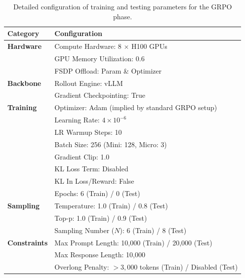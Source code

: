 \begin{table}[htbp]
\centering
\caption{Detailed configuration of training and testing parameters for the GRPO phase.}
\label{tab:grpo_config_styled}
\renewcommand{\arraystretch}{1.15} 

\begin{tabular}{ll}
\toprule
\textbf{Category} & Configuration \\ 
\midrule
\textbf{Hardware} & Compute Hardware: 8 $\times$ H100 GPUs \\
                  & GPU Memory Utilization: 0.6 \\
                  & FSDP Offload: Param \& Optimizer \\

\midrule
\textbf{Backbone} & Rollout Engine: vLLM \\
                  & Gradient Checkpointing: True \\

\midrule
\textbf{Training} & Optimizer: Adam (implied by standard GRPO setup) \\
                  & Learning Rate: $4 \times 10^{-6}$ \\
                  & LR Warmup Steps: 10 \\
                  & Batch Size: 256 (Mini: 128, Micro: 3) \\
                  & Gradient Clip: 1.0 \\
                  & KL Loss Term: Disabled \\
                  & KL In Loss/Reward: False \\
                  & Epochs: 6 (Train) / 0 (Test)\\

\midrule
\textbf{Sampling} & Temperature: 1.0 (Train) / 0.8 (Test) \\
                  & Top-p: 1.0 (Train) / 0.9 (Test) \\
                  & Sampling Number ($N$): 6 (Train) / 8 (Test) \\

\midrule
\textbf{Constraints} & Max Prompt Length: 10,000 (Train) / 20,000 (Test) \\
                     & Max Response Length: 10,000 \\
                     & Overlong Penalty: $> 3,000$ tokens (Train) / Disabled (Test) \\
\bottomrule
\end{tabular}
\end{table}


